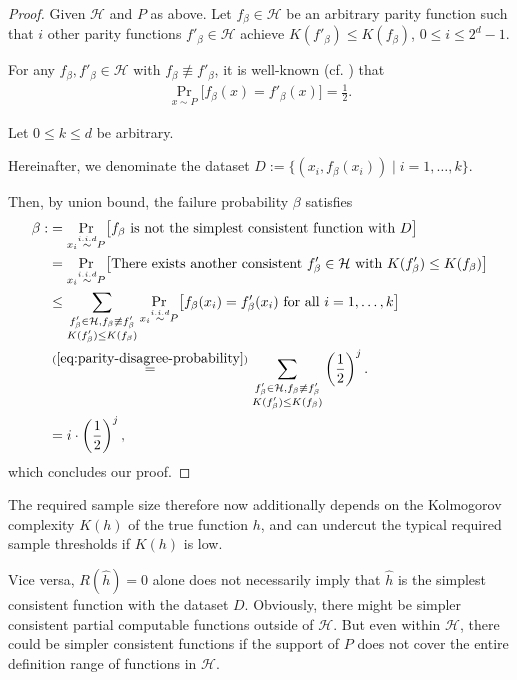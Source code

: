 \begin{proof}
	Given $\mathcal{H}$ and $P$ as above.
	Let $f_\beta\in\mathcal{H}$ be an arbitrary parity function such that $i$ other parity functions $f'_\beta\in\mathcal{H}$ achieve $K(f'_\beta)\leq K(f_\beta)$, $0\leq i\leq 2^d-1$.
	
	For any $f_\beta,f'_\beta\in\mathcal{H}$ with $f_\beta\not\equiv f'_\beta$, it is well-known (cf. \cite[Section 1.3]{o2014analysis}) that 
	\begin{align}
		\label{eq:parity-disagree-probability}
		\operatorname{Pr}_{x\sim P}\bigl[f_\beta(x)=f'_\beta(x)\bigr]=\frac{1}{2}.	
	\end{align}
	
	Let $0\leq k\leq d$ be arbitrary.
	
	Hereinafter, we denominate the dataset $D:=\{(x_i,f_\beta(x_i))\mid i=1,\dots,k\}$.
	
	Then, by union bound, the failure probability $\beta$ satisfies
	\begin{align}
	\beta :&=\underset{x_i\overset{i.i.d}{\sim} P}{\operatorname{Pr}}\bigl[f_\beta \text{ is not the simplest consistent function with } D \bigr]	\\
	&=\underset{x_i\overset{i.i.d}{\sim} P}{\operatorname{Pr}}\bigl[\text{There exists another consistent }f'_\beta\in\mathcal{H} \text{ with } K(f'_\beta)\leq K(f_\beta)\bigr]\\
	&\leq \sum_{\substack{f'_\beta\in\mathcal{H}, f_\beta\not\equiv f'_\beta \\ K(f'_\beta)\leq K(f_\beta)}} \underset{x_i\overset{i.i.d}{\sim} P}{\operatorname{Pr}}\bigl[f_\beta(x_i)=f'_\beta(x_i) \text{ for all }i=1,\dots,k \bigr]\\
	&\overset{(\ref{eq:parity-disagree-probability})}{=} \sum_{\substack{f'_\beta\in\mathcal{H}, f_\beta\not\equiv f'_\beta \\ K(f'_\beta)\leq K(f_\beta)}} \left(\frac{1}{2}\right)^j.\\
	& = i\cdot \left(\frac{1}{2}\right)^j,
	\end{align}
	which concludes our proof.
\end{proof}
The required sample size therefore now additionally depends on the Kolmogorov complexity $K(h)$ of the true function $h$, and can undercut the typical required sample thresholds if $K(h)$ is low. 

Vice versa, $R(\hat{h})=0$ alone does not necessarily imply that $\hat{h}$ is the simplest consistent function with the dataset $D$.
Obviously, there might be simpler consistent partial computable functions outside of $\mathcal{H}$.
But even within $\mathcal{H}$, there could be simpler consistent functions if the support of $P$ does not cover the entire definition range of functions in $\mathcal{H}$. 



